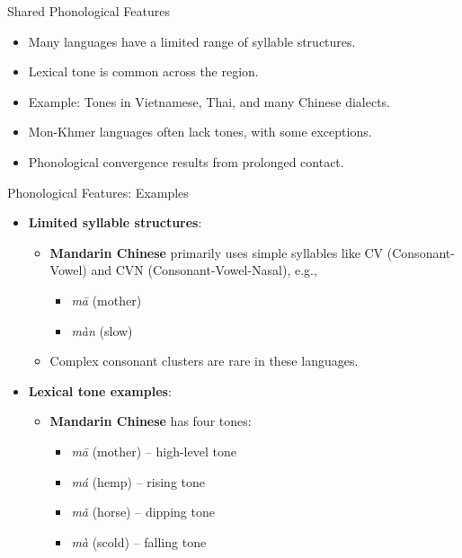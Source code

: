 \documentclass{beamer}
\begin{document}
\begin{frame}{Shared Phonological Features}
    \begin{itemize}
        \item Many languages have a limited range of syllable structures.
        \item Lexical tone is common across the region.
        \item Example: Tones in Vietnamese, Thai, and many Chinese dialects.
        \item Mon-Khmer languages often lack tones, with some exceptions.
        \item Phonological convergence results from prolonged contact.
    \end{itemize}
\end{frame}


\begin{frame}[allowframebreaks]{Phonological Features: Examples}
    \begin{itemize}
        \item \textbf{Limited syllable structures}:
            \begin{itemize}
                \item \textbf{Mandarin Chinese} primarily uses simple syllables like CV (Consonant-Vowel) and CVN (Consonant-Vowel-Nasal), e.g.,
                    \begin{itemize}
                        \item \textit{mā} (mother)
                        \item \textit{màn} (slow)
                    \end{itemize}
                \item Complex consonant clusters are rare in these languages.
            \end{itemize}
        \item \textbf{Lexical tone examples}:
            \begin{itemize}
                \item \textbf{Mandarin Chinese} has four tones:
                    \begin{itemize}
                        \item \textit{mā} (mother) – high-level tone
                        \item \textit{má} (hemp) – rising tone
                        \item \textit{mǎ} (horse) – dipping tone
                        \item \textit{mà} (scold) – falling tone

\end{itemize}
\end{itemize}
\end{itemize}
\end{frame}
\end{document}
